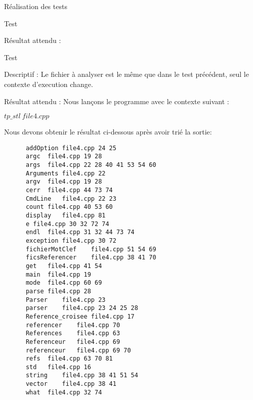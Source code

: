 \documentclass{article}
\begin{document}
\begin{section}{Réalisation des tests}
\begin{subsection}{Test }
\begin{paragraph}{Résultat attendu :}
\begin{listing}[h!]
      \end{listing}
    \end{paragraph}
    
    
  \end{subsection}

  \newpage

  \begin{subsection}{Test }
    \begin{paragraph}{Descriptif :}
      Le fichier à analyser est le même que dans le test précédent, seul le contexte d'execution change.
    \end{paragraph}
    
\begin{paragraph}{Résultat attendu :}
       Nous lançons le programme avec le contexte suivant :  
       \begin{center}
	\textbf{$tp\_stl\ file4.cpp$}
      \end{center}
      
      Nous devons obtenir le résultat ci-dessous après avoir trié la sortie: 
      \begin{listing}[h!]
      \begin{verbatim}
	  addOption	file4.cpp 24 25	
	  argc	file4.cpp 19 28	
	  args	file4.cpp 22 28 40 41 53 54 60	
	  Arguments	file4.cpp 22	
	  argv	file4.cpp 19 28	
	  cerr	file4.cpp 44 73 74	
	  CmdLine	file4.cpp 22 23	
	  count	file4.cpp 40 53 60	
	  display	file4.cpp 81	
	  e	file4.cpp 30 32 72 74	
	  endl	file4.cpp 31 32 44 73 74	
	  exception	file4.cpp 30 72	
	  fichierMotClef	file4.cpp 51 54 69	
	  ficsReferencer	file4.cpp 38 41 70	
	  get	file4.cpp 41 54	
	  main	file4.cpp 19	
	  mode	file4.cpp 60 69	
	  parse	file4.cpp 28	
	  Parser	file4.cpp 23	
	  parser	file4.cpp 23 24 25 28	
	  Reference_croisee	file4.cpp 17	
	  referencer	file4.cpp 70	
	  References	file4.cpp 63	
	  Referenceur	file4.cpp 69	
	  referenceur	file4.cpp 69 70	
	  refs	file4.cpp 63 70 81	
	  std	file4.cpp 16	
	  string	file4.cpp 38 41 51 54	
	  vector	file4.cpp 38 41	
	  what	file4.cpp 32 74	
      \end{verbatim}
  
      \end{listing}
    \end{paragraph}
  \end{subsection}
 
\end{section}
\end{document}

